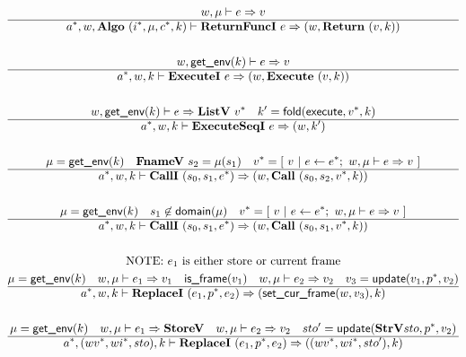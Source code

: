 \begin{gather*}
%
\newline \\
  w, \mu \vdash e \Rightarrow v \\
  \hline
  \seq{a}, w, \algo ~ (\seq{i}, \mu, \seq c, k) \vdash \returnfunci ~ e \Rightarrow (w, \ret ~ (v, k)) \\
%
\newline \\
  w, \getenv(k) \vdash e \Rightarrow v \\
  \hline
  \seq{a}, w, k \vdash \executei ~ e \Rightarrow (w, \exe ~ (v, k)) \\
%
\newline \\
  w, \getenv(k) \vdash e \Rightarrow \listv ~ \seq v \quad
  k' = \fold(\execute, \seq v, k) \\
  \hline
  \seq{a}, w, k \vdash \executeseqi ~ e \Rightarrow (w, k') \\
%
\newline \\
  \mu = \getenv(k) \quad
  \fnamev ~ s_2 = \mu(s_1) \quad
  \seq{v} = [ ~ v ~ | ~ e \leftarrow \seq{e}; ~ w, \mu \vdash e \Rightarrow v ~ ] \\
  \hline
  \seq{a}, w, k \vdash \calli ~ (s_0, s_1, \seq e) \Rightarrow (w, \call ~ (s_0, s_2, \seq v, k)) \\
%
\newline \\
  \mu = \getenv(k) \quad
  s_1 \not\in \domain(\mu) \quad
  \seq{v} = [ ~ v ~ | ~ e \leftarrow \seq{e}; ~ w, \mu \vdash e \Rightarrow v ~ ] \\
  \hline
  \seq{a}, w, k \vdash \calli ~ (s_0, s_1, \seq e) \Rightarrow (w, \call ~ (s_0, s_1, \seq v, k)) \\
%
\newline \\
\text{NOTE: $e_1$ is either store or current frame} \\
  \mu = \getenv(k) \quad
  w, \mu \vdash e_1 \Rightarrow v_1 \quad
  \isframe(v_1) \quad
  w, \mu \vdash e_2 \Rightarrow v_2 \quad
  v_3 = \update(v_1, \seq p, v_2) \\
  \hline
  \seq{a}, w, k \vdash \replacei ~ (e_1, \seq{p}, e_2) \Rightarrow (\setcurframe(w, v_3), k) \\
%
\newline \\
  \mu = \getenv(k) \quad
  w, \mu \vdash e_1 \Rightarrow \storev \quad
  w, \mu \vdash e_2 \Rightarrow v_2 \quad
  sto' = \update(\strv sto, \seq p, v_2) \\
  \hline
  \seq{a}, (\seq{wv}, \seq{wi}, sto), k \vdash \replacei ~ (e_1, \seq{p}, e_2)
  \Rightarrow ((\seq{wv}, \seq{wi}, sto'), k) \\
\end{gather*}

